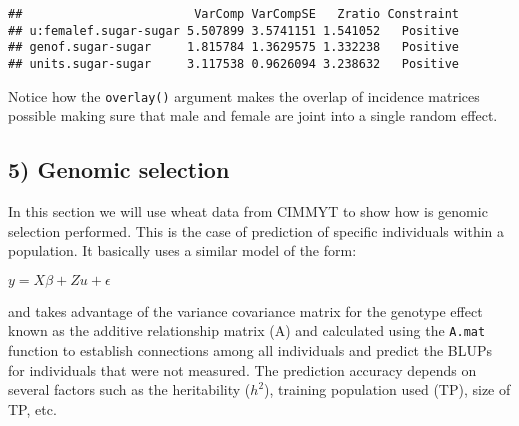 \documentclass[]{article}
\newenvironment{Shaded}{\begin{snugshade}}{\end{snugshade}}
\newcommand{\KeywordTok}[1]{\textcolor[rgb]{0.13,0.29,0.53}{\textbf{#1}}}
\newcommand{\DecValTok}[1]{\textcolor[rgb]{0.00,0.00,0.81}{#1}}
\newcommand{\StringTok}[1]{\textcolor[rgb]{0.31,0.60,0.02}{#1}}
\newcommand{\CommentTok}[1]{\textcolor[rgb]{0.56,0.35,0.01}{\textit{#1}}}
\newcommand{\OtherTok}[1]{\textcolor[rgb]{0.56,0.35,0.01}{#1}}
\newcommand{\OperatorTok}[1]{\textcolor[rgb]{0.81,0.36,0.00}{\textbf{#1}}}
\newcommand{\NormalTok}[1]{#1}
\begin{document}
\begin{verbatim}
##                        VarComp VarCompSE   Zratio Constraint
## u:femalef.sugar-sugar 5.507899 3.5741151 1.541052   Positive
## genof.sugar-sugar     1.815784 1.3629575 1.332238   Positive
## units.sugar-sugar     3.117538 0.9626094 3.238632   Positive
\end{verbatim}

Notice how the \texttt{overlay()} argument makes the overlap of
incidence matrices possible making sure that male and female are joint
into a single random effect.

\subsection{5) Genomic selection}\label{genomic-selection}

In this section we will use wheat data from CIMMYT to show how is
genomic selection performed. This is the case of prediction of specific
individuals within a population. It basically uses a similar model of
the form:

\(y = X\beta + Zu + \epsilon\)

and takes advantage of the variance covariance matrix for the genotype
effect known as the additive relationship matrix (A) and calculated
using the \texttt{A.mat} function to establish connections among all
individuals and predict the BLUPs for individuals that were not
measured. The prediction accuracy depends on several factors such as the
heritability (\(h^2\)), training population used (TP), size of TP, etc.

\begin{Shaded}
\end{Shaded}
\end{document}
